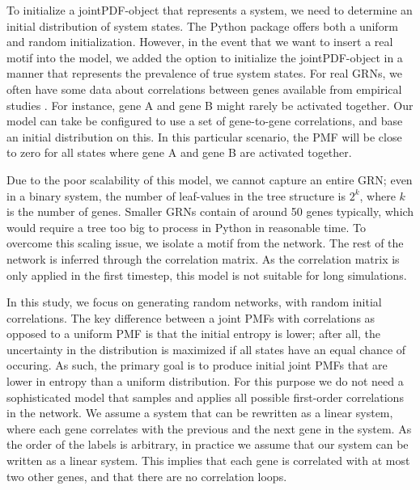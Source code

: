 \documentclass[../main.tex]{subfiles}
\begin{document}
To initialize a jointPDF-object that represents a system, we need to determine an initial distribution of system states.
The Python package offers both a uniform and random initialization.
However, in the event that we want to insert a real motif into the model, we added the option to initialize the jointPDF-object in a manner that represents the prevalence of true system states.
For real GRNs, we often have some data about correlations between genes available from empirical studies \cite{}.
For instance, gene A and gene B might rarely be activated together.
Our model can take be configured to use a set of gene-to-gene correlations, and base an initial distribution on this.
In this particular scenario, the PMF will be close to zero for all states where gene A and gene B are activated together.

Due to the poor scalability of this model, we cannot capture an entire GRN; even in a binary system, the number of leaf-values in the tree structure is $2^k$, where $k$ is the number of genes.
Smaller GRNs contain of around 50 genes typically, which would require a tree too big to process in Python in reasonable time.
To overcome this scaling issue, we isolate a motif from the network.
The rest of the network is inferred through the correlation matrix.
As the correlation matrix is only applied in the first timestep, this model is not suitable for long simulations.

In this study, we focus on generating random networks, with random initial correlations.
The key difference between a joint PMFs with correlations as opposed to a uniform PMF is that the initial entropy is lower; after all, the uncertainty in the distribution is maximized if all states have an equal chance of occuring.
As such, the primary goal is to produce initial joint PMFs that are lower in entropy than a uniform distribution. 
For this purpose we do not need a sophisticated model that samples and applies all possible first-order correlations in the network.
We assume a system that can be rewritten as a linear system, where each gene correlates with the previous and the next gene in the system.
As the order of the labels is arbitrary, in practice we assume that our system can be written as a linear system.
This implies that each gene is correlated with at most two other genes, and that there are no correlation loops.
\end{document}

